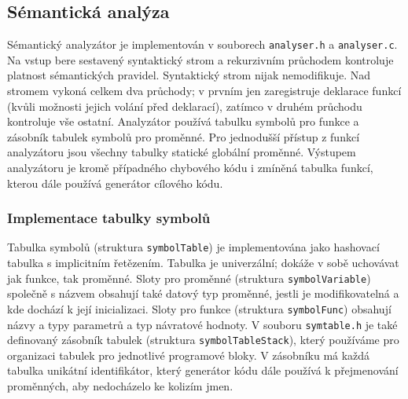 \subsection{Sémantická analýza}
Sémantický analyzátor je implementován v souborech \texttt{analyser.h} a \texttt{analyser.c}.
Na vstup bere sestavený syntaktický strom a rekurzivním průchodem kontroluje platnost sémantických pravidel.
Syntaktický strom nijak nemodifikuje.
Nad stromem vykoná celkem dva průchody; v prvním jen zaregistruje deklarace funkcí (kvůli možnosti jejich volání před deklarací),
zatímco v druhém průchodu kontroluje vše ostatní.
Analyzátor používá tabulku symbolů pro funkce a zásobník tabulek symbolů pro proměnné.
Pro jednodušší přístup z funkcí analyzátoru jsou všechny tabulky statické globální proměnné.
Výstupem analyzátoru je kromě případného chybového kódu i zmíněná tabulka funkcí, kterou dále používá generátor cílového kódu.

\subsubsection{Implementace tabulky symbolů}
Tabulka symbolů (struktura \texttt{symbolTable}) je implementována jako hashovací tabulka s implicitním řetězením.
Tabulka je univerzální; dokáže v sobě uchovávat jak funkce, tak proměnné.
Sloty pro proměnné (struktura \texttt{symbolVariable}) společně s názvem obsahují také datový typ proměnné,
jestli je modifikovatelná a kde dochází k její inicializaci.
Sloty pro funkce (struktura \texttt{symbolFunc}) obsahují názvy a typy parametrů a typ návratové hodnoty.
V souboru \texttt{symtable.h} je také definovaný zásobník tabulek (struktura \texttt{symbolTableStack}),
který používáme pro organizaci tabulek pro jednotlivé programové bloky.
V zásobníku má každá tabulka unikátní identifikátor,
který generátor kódu dále používá k přejmenování proměnných, aby nedocházelo ke kolizím jmen.

